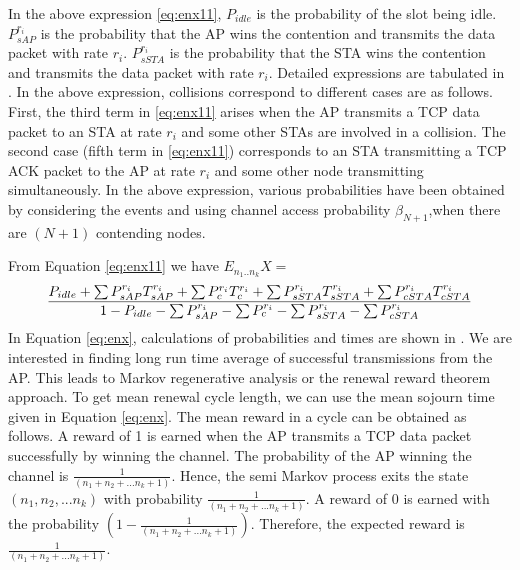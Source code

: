 \documentclass[conference]{IEEEtran}
\begin{document}
In the above expression \eqref{eq:enx11}, $ P_{idle} $ is the probability of
the slot being idle. $ P^{r_i}_{sAP} $ is the probability that the AP wins the
contention and transmits the data packet with rate $ r_i$. $ P^{r_i}_{sSTA} $
is the probability that the STA wins the contention and transmits the data
packet with rate $ r_i$. Detailed expressions are tabulated in 
\cite{astn_model:pradeep_kuri}.
In the above expression, collisions correspond to different cases are as
follows. First, the third term in \eqref{eq:enx11} arises when the AP transmits
a TCP data packet to an STA at rate $ r_i $ and some other STAs are involved in
a collision. The second case (fifth term in \eqref{eq:enx11}) corresponds to an
STA transmitting a TCP ACK packet to the AP at rate $ r_i $ and some other node
transmitting simultaneously. In the above expression, various probabilities
have been obtained by considering the events and using channel access
probability $\beta _{N+ 1} $,when there are $(N + 1)$ contending nodes.

From Equation \eqref{eq:enx11} we have $ E_{n_1..n_k}X = $
\begin{equation}
\fontsize{6}{6} \selectfont
\frac{ P_{idle} + \sum P^{r_i} _{sAP} T^{r_i} _{sAP} + \sum 
P^{r_i} _{c}T^{r_i} _{c}  +\sum P^{r_i} _{sSTA} T^{r_i} _{sSTA} +\sum P^{r_i} 
_{cSTA} T^{r_i} _{cSTA}   }{1- P_{idle} -\sum P^{r_i} _{sAP} -\sum P^{r_i} _{c} 
-\sum P^{r_i} _{sSTA} -\sum P^{r_i} _{cSTA} }
\label{eq:enx}
\end{equation}
In Equation \ref{eq:enx}, calculations of probabilities and times are shown in \cite{astn_model:pradeep_kuri}.
We are interested in finding long run time average of successful transmissions
from the AP. This leads to Markov regenerative analysis or the renewal reward
theorem approach. To get mean renewal cycle length, we can use the mean sojourn
time given in Equation \eqref{eq:enx}. The mean reward in a cycle can be obtained
as follows. 
A reward of 1 is earned when the AP transmits a TCP data packet successfully by 
winning the channel. The probability of the AP winning the channel is  
$ \frac{1}{(n_1 + n_2 + ... n_k + 1)}$. Hence, the semi Markov 
process exits the state $ (n_1,n_2,... n_k )$ with probability $ \frac{1}{(n_1 
+ n_2 + ... n_k + 1)}$. A reward of 0 is earned with the probability $ ( 1- 
\frac{1}{(n_1 + n_2+ ... n_k + 1)} )$. Therefore, the expected reward is  $ 
\frac{1}{(n_1 + n_2 + ... n_k + 1)}$.
\end{document}
